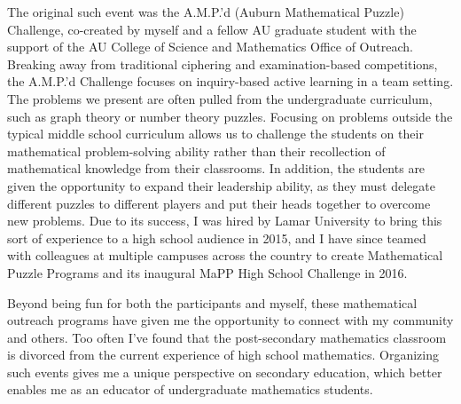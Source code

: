 \documentclass[11pt]{amsart}
\theoremstyle{plain}
\newcommand{\<}{\langle}
\renewcommand{\>}{\rangle}
\begin{document}
The original such event was the A.M.P.'d (Auburn Mathematical Puzzle)
Challenge, co-created by myself and a fellow AU graduate
student with the support of the AU College of Science and Mathematics Office
of Outreach. Breaking away from traditional ciphering and examination-based
competitions, the A.M.P.'d Challenge focuses on inquiry-based active learning
in a team setting. The problems we present are often pulled from the
undergraduate curriculum, such as graph theory or number theory puzzles.
Focusing on problems outside the typical middle school curriculum allows us
to challenge the students on their mathematical problem-solving ability rather
than their recollection of mathematical knowledge from their classrooms.
In addition, the students are given the opportunity to expand their leadership
ability, as they must delegate different puzzles to different players and
put their heads together to overcome new problems. Due to its success,
I was hired by Lamar University to bring this sort of experience to a high
school audience in 2015, and I have since teamed with colleagues at multiple
campuses across the country to create Mathematical Puzzle Programs and
its inaugural MaPP High School Challenge in 2016.

Beyond being fun for both the participants and myself, these mathematical
outreach programs have given me the opportunity to connect with my
community and others. Too often I've found that the post-secondary mathematics
classroom is divorced from the current experience of high school mathematics.
Organizing such events gives me a unique
perspective on secondary education, which better enables me as an educator of
undergraduate mathematics students.




\end{document}
